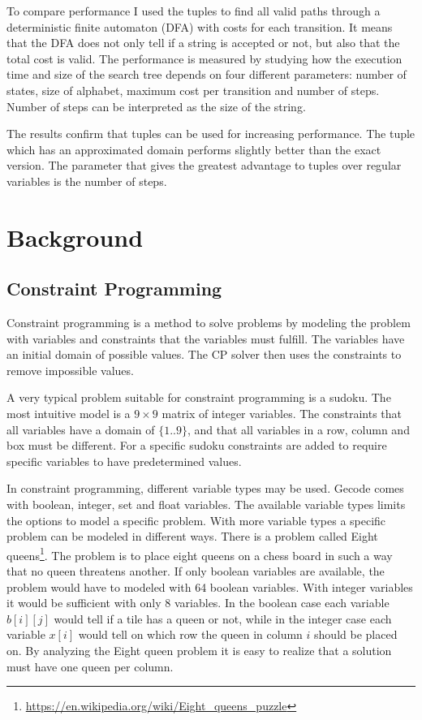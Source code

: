\documentclass[a4paper,11pt]{article}
\begin{document}
To compare performance I used the tuples to find all valid paths through a deterministic finite automaton (DFA) with costs for each transition. It means that the DFA does not only tell if a string is accepted or not, but also that the total cost is valid. The performance is measured by studying how the execution time and size of the search tree depends on four different parameters: number of states, size of alphabet, maximum cost per transition and number of steps. Number of steps can be interpreted as the size of the string.

The results confirm that tuples can be used for increasing performance. The tuple which has an approximated domain performs slightly better than the exact version. The parameter that gives the greatest advantage to tuples over regular variables is the number of steps.



\section{Background}
\subsection{Constraint Programming}

Constraint programming is a method to solve problems by modeling the problem with variables and constraints that the variables must fulfill. The variables have an initial domain of possible values. The CP solver then uses the constraints to remove impossible values. 

A very typical problem suitable for constraint programming is a sudoku. The most intuitive model is a $9\times9$ matrix of integer variables. The constraints that all variables have a domain of $\{1..9\}$, and that all variables in a row, column and box must be different. For a specific sudoku constraints are added to require specific variables to have predetermined values.

In constraint programming, different variable types may be used. Gecode comes with boolean, integer, set and float variables. The available variable types limits the options to model a specific problem. With more variable types a specific problem can be modeled in different ways. There is a problem called Eight queens\footnote{\url{https://en.wikipedia.org/wiki/Eight_queens_puzzle}}. The problem is to place eight queens on a chess board in such a way that no queen threatens another. If only boolean variables are available, the problem would have to modeled with 64 boolean variables. With integer variables it would be sufficient with only 8 variables. In the boolean case each variable $b[i][j]$ would tell if a tile has a queen or not, while in the integer case each variable $x[i]$ would tell on which row the queen in column $i$ should be placed on. By analyzing the Eight queen problem it is easy to realize that a solution must have one queen per column.
\end{document}
